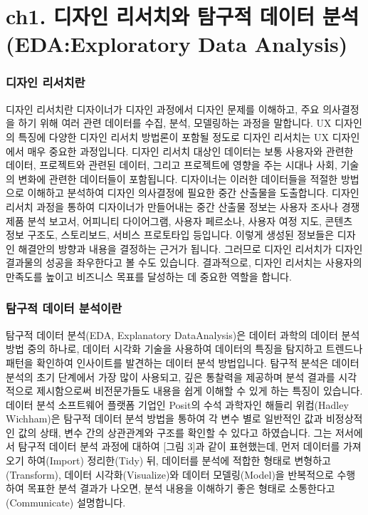 \documentclass[
  letterpaper,
]{book}
\begin{document}
\chapter{ch1. 디자인 리서치와 탐구적 데이터 분석 (EDA:Exploratory Data
Analysis)}\label{ch1.-uxb514uxc790uxc778-uxb9acuxc11cuxce58uxc640-uxd0d0uxad6cuxc801-uxb370uxc774uxd130-uxbd84uxc11d-edaexploratory-data-analysis}

\subsection{디자인
리서치란}\label{uxb514uxc790uxc778-uxb9acuxc11cuxce58uxb780}

디자인 리서치란 디자이너가 디자인 과정에서 디자인 문제를 이해하고, 주요
의사결정을 하기 위해 여러 관련 데이터를 수집, 분석, 모델링하는 과정을
말합니다. UX 디자인의 특징에 다양한 디자인 리서치 방법론이 포함될 정도로
디자인 리서치는 UX 디자인에서 매우 중요한 과정입니다. 디자인 리서치
대상인 데이터는 보통 사용자와 관련한 데이터, 프로젝트와 관련된 데이터,
그리고 프로젝트에 영향을 주는 시대나 사회, 기술의 변화에 관련한
데이터들이 포함됩니다. 디자이너는 이러한 데이터들을 적절한 방법으로
이해하고 분석하여 디자인 의사결정에 필요한 중간 산출물을 도출합니다.
디자인 리서치 과정을 통하여 디자이너가 만들어내는 중간 산출물 정보는
사용자 조사나 경쟁 제품 분석 보고서, 어피니티 다이어그램, 사용자
페르소나, 사용자 여정 지도, 콘텐츠 정보 구조도, 스토리보드, 서비스
프로토타입 등입니다. 이렇게 생성된 정보들은 디자인 해결안의 방향과
내용을 결정하는 근거가 됩니다. 그러므로 디자인 리서치가 디자인 결과물의
성공을 좌우한다고 볼 수도 있습니다. 결과적으로, 디자인 리서치는 사용자의
만족도를 높이고 비즈니스 목표를 달성하는 데 중요한 역할을 합니다.

\subsection{탐구적 데이터
분석이란}\label{uxd0d0uxad6cuxc801-uxb370uxc774uxd130-uxbd84uxc11duxc774uxb780}

탐구적 데이터 분석(EDA, Explanatory DataAnalysis)은 데이터 과학의 데이터
분석 방법 중의 하나로, 데이터 시각화 기술을 사용하여 데이터의 특징을
탐지하고 트렌드나 패턴을 확인하여 인사이트를 발견하는 데이터 분석
방법입니다. 탐구적 분석은 데이터 분석의 초기 단계에서 가장 많이
사용되고, 깊은 통찰력을 제공하며 분석 결과를 시각적으로 제시함으로써
비전문가들도 내용을 쉽게 이해할 수 있게 하는 특징이 있습니다. 데이터
분석 소프트웨어 플랫폼 기업인 Posit의 수석 과학자인 해들리 위컴(Hadley
Wichham)은 탐구적 데이터 분석 방법을 통하여 각 변수 별로 일반적인 값과
비정상적인 값의 상태, 변수 간의 상관관계와 구조를 확인할 수 있다고
하였습니다. 그는 저서에서 탐구적 데이터 분석 과정에 대하여 {[}그림
3{]}과 같이 표현했는데, 먼저 데이터를 가져오기 하여(Import) 정리한(Tidy)
뒤, 데이터를 분석에 적합한 형태로 변형하고(Transform), 데이터
시각화(Visualize)와 데이터 모델링(Model)을 반복적으로 수행하여 목표한
분석 결과가 나오면, 분석 내용을 이해하기 좋은 형태로
소통한다고(Communicate) 설명합니다.
\end{document}
